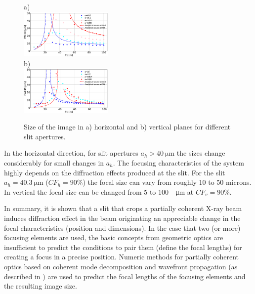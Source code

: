 \documentclass[9pt,twocolumn,twoside]{osajnl}
\begin{document}
\begin{figure}[H]
a)\\
\hspace{-2.0cm}
    \includegraphics[width=0.40\textwidth]{figures/sizes_h.eps}\\
b)\\
\hspace{-2.0cm}
    \includegraphics[width=0.40\textwidth]{figures/sizes_v.eps}

    \caption{
    \label{fig:focalSizes}
    Size of the image in a) horizontal and b) vertical planes for different slit apertures.
    }
\end{figure}

In the horizontal direction, for slit apertures $a_h>\SI{40}{\micro\meter}$ the sizes change considerably for small changes in $a_h$. The focusing characteristics of the system highly depends on the diffraction effects produced at the slit. For the slit $a_h=\SI{40.3}{\micro\meter}$ ($CF_h=90\%$) the focal size can vary from roughly 10 to 50 microns. In vertical the focal size can be changed from 5 to 100~\SI{}{\micro\meter} at $CF_v=90\%$.

In summary, it is shown that a slit that crops a partially coherent X-ray beam induces diffraction effect in the beam originating an appreciable change in the focal characteristics (position and dimensions). In the case that two (or more) focusing elements are used, the basic concepts from geometric optics are insufficient to predict the conditions to pair them (define the focal lengths) for creating a focus in a precise position. Numeric methods for partially coherent optics based on coherent mode decomposition and wavefront propagation (as described in \cite{delrio2021pairing}) are used to predict the focal lengths of the focusing elements and the resulting image size.   
\end{document}
